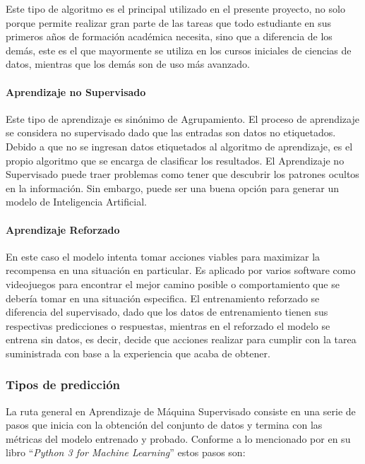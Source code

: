 Este tipo de algoritmo es el principal utilizado en el presente proyecto, no solo porque permite realizar gran parte de las tareas que todo estudiante en sus primeros años de formación académica necesita, sino que a diferencia de los demás, este es el que mayormente se utiliza en los cursos iniciales de ciencias de datos, mientras que los demás son de uso más avanzado.

\paragraph{Aprendizaje no Supervisado} Este tipo de aprendizaje es sinónimo de Agrupamiento. El proceso de aprendizaje se considera no supervisado dado que las entradas son datos no etiquetados. Debido a que no se ingresan datos etiquetados al algoritmo de aprendizaje, es el propio algoritmo que se encarga de clasificar los resultados. El Aprendizaje no Supervisado puede traer problemas como tener que descubrir los patrones ocultos en la información. Sin embargo, puede ser una buena opción para generar un modelo de Inteligencia Artificial.

\paragraph{Aprendizaje Reforzado} En este caso el modelo intenta tomar acciones viables para maximizar la recompensa en una situación en particular. Es aplicado por varios software como videojuegos para encontrar el mejor camino posible o comportamiento que se debería tomar en una situación especifica. El entrenamiento reforzado se diferencia del supervisado, dado que los datos de entrenamiento tienen sus respectivas predicciones o respuestas, mientras en el reforzado el modelo se entrena sin datos, es decir, decide que acciones realizar para cumplir con la tarea suministrada con base a la experiencia que acaba de obtener.

\subsubsection{Tipos de predicción}
La ruta general en Aprendizaje de Máquina Supervisado consiste en una serie de pasos que inicia con la obtención del conjunto de datos y termina con las métricas del modelo entrenado y probado. Conforme a lo mencionado por \textcite{oswald2020python} en su libro ``\textit{Python 3 for Machine Learning}'' estos pasos son:

